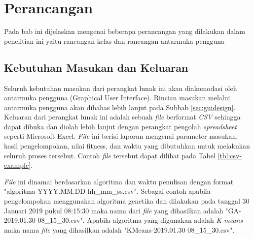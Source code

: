 \chapter{Perancangan}
\label{chap:perancangan}

Pada bab ini dijelaskan mengenai beberapa perancangan yang dilakukan dalam penelitian ini yaitu rancangan kelas dan rancangan antarmuka pengguna

\section{Kebutuhan Masukan dan Keluaran}
Seluruh kebutuhan masukan dari perangkat lunak ini akan diakomodasi oleh antarmuka pengguna (Graphical User Interface). Rincian masukan melalui antarmuka pengguna akan dibahas lebih lanjut pada Subbab \ref{sec:guidesign}. Keluaran dari perangkat lunak ini adalah sebuah \textit{file} berformat \textit{CSV} sehingga dapat dibuka dan diolah lebih lanjut dengan perangkat pengolah \textit{spreadsheet} seperti Microsoft Excel. \textit{File} ini berisi laporan mengenai parameter masukan, hasil pengelompokan, nilai fitness, dan waktu yang dibutuhkan untuk melakukan seluruh proses tersebut. Contoh \textit{file} tersebut dapat dilihat pada Tabel \ref{tbl:csv-example}. 

\textit{File} ini dinamai berdasarkan algoritma dan waktu penulisan dengan format "algoritma-YYYY.MM.DD hh{\_}mm{\_}ss.csv". Sebagai contoh apabila pengelompokan menggunakan algoritma genetika dan dilakukan pada tanggal 30 Januari 2019 pukul 08:15:30 maka nama dari \textit{file} yang dihasilkan adalah "GA-2019.01.30 08{\_}15{\_}30.csv". Apabila algoritma yang digunakan adalah \textit{K-means} maka nama \textit{file} yang dihasilkan adalah "KMeans-2019.01.30 08{\_}15{\_}30.csv".

